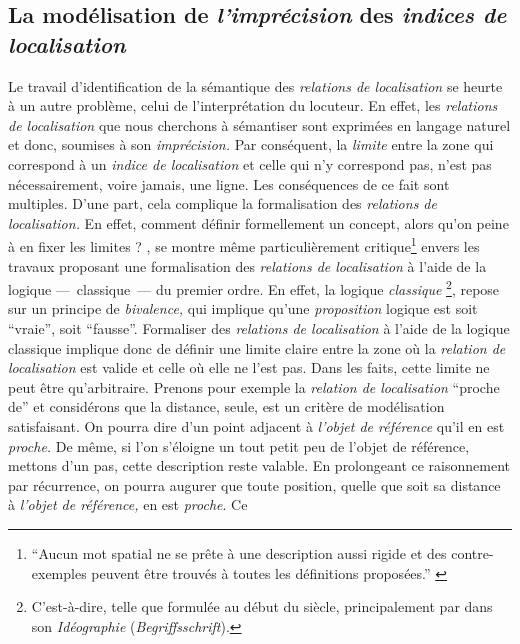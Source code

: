 \subsection{La modélisation de \emph{l'imprécision} des \emph{indices
    de localisation}}
\label{subsec:2-1-2}

Le travail d'identification de la sémantique des \emph{relations de
  localisation} se heurte à un autre problème, celui de
l'interprétation du locuteur. En effet, les \emph{relations de
  localisation} que nous cherchons à sémantiser sont exprimées en
langage naturel et donc, soumises à son \emph{imprécision.} Par
conséquent, la \emph{limite} entre la zone qui correspond à un
\emph{indice de localisation} et celle qui n'y correspond pas, n'est
pas nécessairement, voire jamais, une ligne. Les conséquences de ce
fait sont multiples. D'une part, cela complique la formalisation des
\emph{relations de localisation.} En effet, comment définir
formellement un concept, alors qu'on peine à en fixer les limites ?
\textcite{Vandeloise1986}, se montre même particulièrement
critique\footnote{\enquote{Aucun mot spatial ne se prête à une
    description aussi rigide et des contre-exemples peuvent être
    trouvés à toutes les définitions proposées.}
  \autocite[p. 18]{Vandeloise1986}} envers les travaux proposant une
formalisation des \emph{relations de localisation} à l'aide de la
logique ---~classique~--- du premier ordre. En effet, la logique
\emph{classique} \footnote{C'est-à-dire, telle que formulée au début
  du  siècle, principalement par  dans son
  \emph{Idéographie} (\emph{Begriffsschrift}).}, repose sur un
principe de \emph{bivalence,} qui implique qu'une \emph{proposition}
logique est soit \enquote{vraie}, soit \enquote{fausse}. Formaliser
des \emph{relations de localisation} à l'aide de la logique classique
implique donc de définir une limite claire entre la zone où la
\emph{relation de localisation} est valide et celle où elle ne l'est
pas. Dans les faits, cette limite ne peut être qu'arbitraire. Prenons
pour exemple la \emph{relation de localisation} \enquote{proche de} et
considérons que la distance, seule, est un critère de modélisation
satisfaisant. On pourra dire d'un point adjacent à \emph{l'objet de
  référence} qu'il en est \emph{proche.} De même, si l'on s'éloigne un
tout petit peu de l'objet de référence, mettons d'un pas, cette
description reste valable. En prolongeant ce raisonnement par
récurrence, on pourra augurer que toute position, quelle que soit sa
distance à \emph{l'objet de référence,} en est \emph{proche}. Ce
